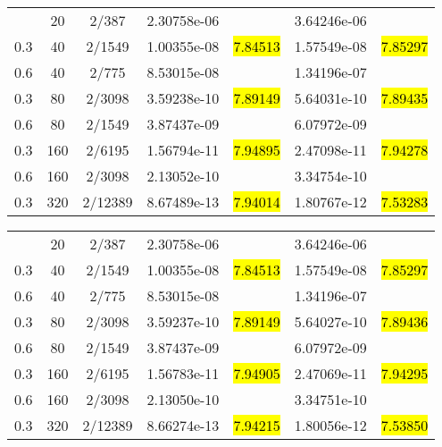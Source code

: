 \begin{table}[htbp]
	\label{ta:1D-ex2-WHC8}
	\centering
	\begin{tabular}{ccccccc}
		\toprule
		\titleintable
		\midrule
		0.6 & 20  & 2/387   & 2.30758e-06 &              & 3.64246e-06 &              \\
		0.3 & 40  & 2/1549  & 1.00355e-08 & \hl{7.84513} & 1.57549e-08 & \hl{7.85297} \\
		\midrule
		0.6 & 40  & 2/775   & 8.53015e-08 &              & 1.34196e-07 &              \\
		0.3 & 80  & 2/3098  & 3.59238e-10 & \hl{7.89149} & 5.64031e-10 & \hl{7.89435} \\
		\midrule
		0.6 & 80  & 2/1549  & 3.87437e-09 &              & 6.07972e-09 &              \\
		0.3 & 160 & 2/6195  & 1.56794e-11 & \hl{7.94895} & 2.47098e-11 & \hl{7.94278} \\
		\midrule
		0.6 & 160 & 2/3098  & 2.13052e-10 &              & 3.34754e-10 &              \\
		0.3 & 320 & 2/12389 & 8.67489e-13 & \hl{7.94014} & 1.80767e-12 & \hl{7.53283} \\
		\bottomrule
	\end{tabular}
\end{table}

\begin{table}[htbp]
	\label{ta:1D-ex2-HHC8}
	\centering
	\begin{tabular}{ccccccc}
		\toprule
		\titleintable
		\midrule
		0.6 & 20  & 2/387   & 2.30758e-06 &              & 3.64246e-06 &              \\
		0.3 & 40  & 2/1549  & 1.00355e-08 & \hl{7.84513} & 1.57549e-08 & \hl{7.85297} \\
		\midrule
		0.6 & 40  & 2/775   & 8.53015e-08 &              & 1.34196e-07 &              \\
		0.3 & 80  & 2/3098  & 3.59237e-10 & \hl{7.89149} & 5.64027e-10 & \hl{7.89436} \\
		\midrule
		0.6 & 80  & 2/1549  & 3.87437e-09 &              & 6.07972e-09 &              \\
		0.3 & 160 & 2/6195  & 1.56783e-11 & \hl{7.94905} & 2.47069e-11 & \hl{7.94295} \\
		\midrule
		0.6 & 160 & 2/3098  & 2.13050e-10 &              & 3.34751e-10 &              \\
		0.3 & 320 & 2/12389 & 8.66274e-13 & \hl{7.94215} & 1.80056e-12 & \hl{7.53850} \\
		\bottomrule
	\end{tabular}
\end{table}
\undef\titleintable